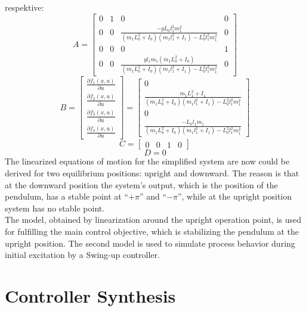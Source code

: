respektive:
\begin{equation}
	A =\begin{bmatrix}0&1&0&0\\
	0&0&\frac{-gL_0l_1^2m_1^2}{(m_1L_0^2+I_0)(m_1l_1^2+I_1)-L_0^2l_1^2m_1^2}&0\\
	0&0&0&1\\
	0&0&\frac{gl_1m_1(m_1L_0^2+I_0)}{(m_1L_0^2+I_0)(m_1l_1^2+I_1)-L_0^2l_1^2m_1^2}&0
	\end{bmatrix}
\end{equation}
\begin{equation}B = \begin{bmatrix}
\frac{\partial f_1(x,u)}{\partial u}\\\frac{\partial f_2(x,u)}{\partial u}\\\frac{\partial f_3(x,u)}{\partial u}\\\frac{\partial f_4(x,u)}{\partial u}
\end{bmatrix}=\begin{bmatrix}
0\\ 
\frac{m_1L_1^2+I_1}{(m_1L_0^2+I_0)(m_1l_1^2+I_1)-L_0^2l_1^2m_1^2}\\0\\
\frac{-L_0l_1m_1}{(m_1L_0^2+I_0)(m_1l_1^2+I_1)-L_0^2l_1^2m_1^2}
\end{bmatrix}\end{equation}
\begin{equation}C = \begin{bmatrix}0&0&1&0\end{bmatrix}\end{equation}
\begin{equation}D = 0\end{equation}
The linearized equations of motion for the simplified system are now could be derived for two equilibrium positions: upright and downward. The reason is that at the downward position the system's output, which is the position of the pendulum, has a stable point at “$+\pi$” and “$-\pi$”, while at the upright position system has no stable point.\\

The model, obtained by linearization around the upright operation point, is used for fulfilling the main control objective, which is stabilizing the pendulum at the upright position. The second model is used to simulate process behavior during initial excitation by a Swing-up controller.
\section{Controller Synthesis}

